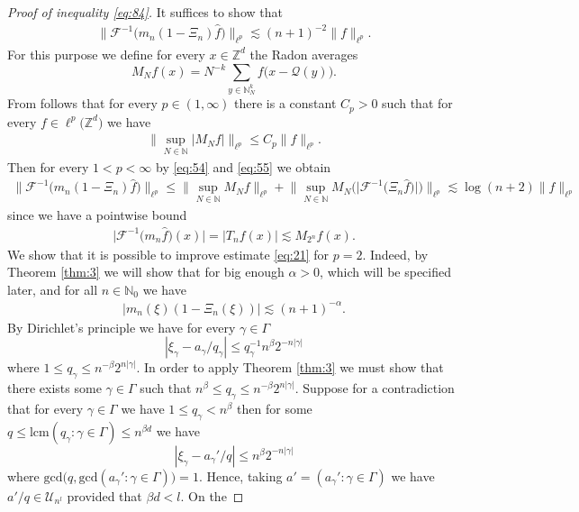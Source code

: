 \documentclass[a4paper,oneside]{amsart}
\theoremstyle{plain}
\theoremstyle{definition}
\numberwithin{equation}{section}
\newcounter{thm}
\theoremstyle{plain}
\newcommand{\ZZ}{\mathbb{Z}}
\newcommand{\NN}{\mathbb{N}}
\newcommand{\calQ}{\mathcal{Q}}
\newcommand{\8}{\infty}
\begin{document}
\begin{proof}[Proof of inequality \eqref{eq:84}]
It suffices to show that
\begin{align}
  \label{eq:38}
  \big\|\mathcal
  F^{-1}\big(m_n(1-\Xi_{n})\hat{f}\big)\big\|_{\ell^p}\lesssim (n+1)^{-2}\|f\|_{\ell^p}.
\end{align}
For this purpose we   define for every $x\in\ZZ^d$ the Radon averages  
\[
M_Nf(x)=N^{-k}\sum_{y\in\NN_N^k}f\big(x-\calQ(y)\big).
\]
From \cite{mst1} follows that for every $p\in(1, \infty)$ there is a constant
$C_p>0$ such that for every $f\in\ell^p\big(\ZZ^d\big)$ we have
\begin{align}
  \label{eq:55}
  \big\|\sup_{N\in\NN}|M_Nf|\big\|_{\ell^p}\le C_p\|f\|_{\ell^p}.
\end{align}
Then for every $1<p<\infty$ by \eqref{eq:54} and \eqref{eq:55}  we obtain 
\begin{align}
  \label{eq:21}
  \big\|\mathcal
  F^{-1}\big(m_n(1-\Xi_{n})\hat{f}\big)\big\|_{\ell^p}\le
\big\|\sup_{N\in\NN}M_Nf\big\|_{\ell^p}+\big\|\sup_{N\in\NN}M_N\big(\big|
  \mathcal
  F^{-1}\big(\Xi_{n}\hat{f}\big)\big|\big)\big\|_{\ell^p}\lesssim \log (n+2)\|f\|_{\ell^p}
\end{align}
since we have a pointwise bound
\begin{align}
  \label{eq:63}
\big|\mathcal F^{-1}\big(m_n\hat{f}\big)(x)\big|=|T_nf(x)|\lesssim M_{2^n}f(x).  
\end{align}
We show that it is possible to improve  estimate
\eqref{eq:21} 
for $p=2$. 
Indeed, by Theorem \ref{thm:3} we will show that for big enough $\alpha>0$, which will be specified
later, and for all $n\in\NN_0$  we have
\begin{align}
  \label{eq:60}
 \big|
 m_{n}(\xi)(1-\Xi_{n}(\xi))\big|\lesssim (n+1)^{-\alpha}.
\end{align} 
By Dirichlet's principle we have for every $\gamma\in\Gamma$ 
\[
|\xi_{\gamma}-a_{\gamma}/q_{\gamma}|\le q_{\gamma}^{-1}n^{\beta}2^{-n|\gamma|}
\] 
where $1\le q_{\gamma}\le n^{-\beta}2^{n|\gamma|}$. In order to apply
Theorem \ref{thm:3} we must show that there exists some
$\gamma\in\Gamma$ such that $n^{\beta}\le q_{\gamma }\le
n^{-\beta}2^{n|\gamma|}$. Suppose for a contradiction that for every
$\gamma \in \Gamma$  we have $1\le q_{\gamma }<n^{\beta} $ then for
some 
$q\le \mathrm{lcm}(q_{\gamma}: \gamma\in\Gamma)\le n^{\beta d}$ we have 
\[
|\xi_{\gamma}-a_{\gamma}'/q|\le n^{\beta}2^{-n|\gamma|}
\] 
where $\mathrm{gcd}\big(q, \mathrm{gcd}({a_{\gamma}'}:
\gamma\in\Gamma)\big)=1$.
Hence, taking $a'=(a_{\gamma}': \gamma\in\Gamma)$ we have
$a'/q\in\mathscr U_{n^l}$ provided that $\beta d<l$. On the

\end{proof}
\end{document}

